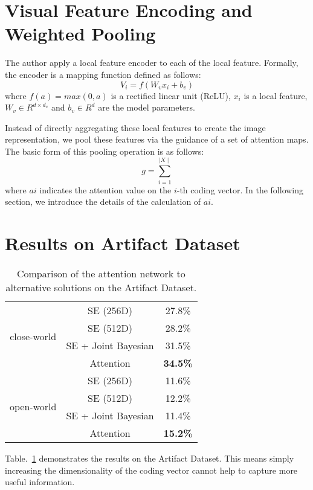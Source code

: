 \documentclass{article}
\begin{document}
\section{Visual Feature Encoding and Weighted Pooling}
The author apply a local feature encoder to each of the local feature. Formally, the encoder is a mapping function defined as follows:
\begin{equation} \label{1}
V_i=f(W_{v}x_{i}+b_v)
\end{equation}
where $f(a)=max(0,a)$ is a rectified linear unit (ReLU), $x_i$ is a local feature, $W_v\in{R^{d\times d_v}}$ and $b_v\in R^d$ are the model parameters.
\par
Instead of directly aggregating these local features to create the image representation, we pool these features via the guidance of a set of attention maps. The basic form of this pooling operation is as follows:
\begin{equation} \label{2}
g=\sum\limits_{i=1}^{\mid X\mid}
\end{equation}
where $ai$ indicates the attention value on the $i$-th coding vector. In the following section, we introduce the details of the calculation of $ai$.
\par
\section{Results on Artifact Dataset}
\begin{table}[htbp]
\centering
\begin{tabular}{|c|c|c|}
\hline
\multirow{4}{*}{close-world}
&SE (256D) & 27.8\% \\

&SE (512D) &  28.2\% \\

&SE + Joint Bayesian &  31.5\% \\

&Attention & \textbf{34.5\%}\\
\hline
\multirow{5}{*}{open-world}
&SE (256D) & 11.6\% \\

&SE (512D) & 12.2\% \\

&SE + Joint Bayesian & 11.4\%\\

&Attention & \textbf{15.2\%}\\
\hline
\end{tabular}
\caption{Comparison of the attention network to alternative solutions on the Artifact Dataset.}
\label{tab1}
\end{table}
\par
Table.~\ref{tab1} demonstrates the results on the Artifact Dataset. \cite{Chen2012Bayesian}This means simply increasing the dimensionality of the coding vector cannot help to capture more useful information.


\end{document}
